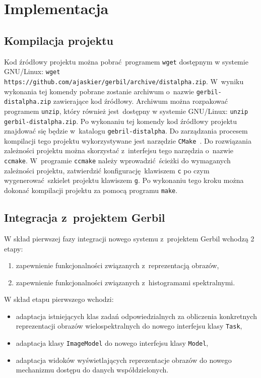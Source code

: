 \chapter{Implementacja}

\section{Kompilacja projektu}
Kod źródłowy projektu można pobrać programem \lstinline$wget$ dostępnym w systemie GNU/Linux: \lstinline$wget https://github.com/ajaskier/gerbil/archive/distalpha.zip$. W~wyniku wykonania tej komendy pobrane zostanie archiwum o~nazwie \lstinline$gerbil-distalpha.zip$ zawierające kod źródłowy. Archiwum można rozpakować programem \lstinline$unzip$, który również jest dostępny w systemie \mbox{GNU/Linux:} \lstinline$unzip gerbil-distalpha.zip$. Po wykonaniu tej komendy kod źródłowy projektu znajdować się będzie w~katalogu \lstinline$gebril-distalpha$. Do zarządzania procesem kompilacji tego projektu wykorzystywane jest narzędzie \lstinline$CMake$~\cite{cmake}. Do rozwiązania zależności projektu można skorzystać z~interfejsu tego narzędzia o~nazwie \lstinline$ccmake$. W~programie \lstinline$ccmake$ należy wprowadzić ścieżki do wymaganych zależności projektu, zatwierdzić konfigurację klawiszem \lstinline$c$ po czym wygenerować szkielet projektu klawiszem \lstinline$g$. Po wykonaniu tego kroku można dokonać kompilacji projektu za pomocą programu \lstinline$make$.

\section{Integracja z~projektem Gerbil}
W skład pierwszej fazy integracji nowego systemu z~projektem Gerbil wchodzą 2 etapy:
\begin{enumerate}[labelwidth=\widthof{\ref{last-item2}},label=\arabic*.]
	\item zapewnienie funkcjonalności związanych z~reprezentacją obrazów,
	\item zapewnienie funkcjonalności związanych z~histogramami spektralnymi.
\end{enumerate}

W skład etapu pierwszego wchodzi: 
\begin{itemize}
		\item adaptacja istniejących klas zadań odpowiedzialnych za obliczenia konkretnych reprezentacji obrazów wielospektralnych do nowego interfejsu klasy \lstinline$Task$,
		\item adaptacja klasy \lstinline$ImageModel$ do nowego interfejsu klasy \lstinline$Model$,
		\item adaptacja widoków wyświetlających reprezentacje obrazów do nowego mechanizmu dostępu do danych współdzielonych.
\end{itemize}

